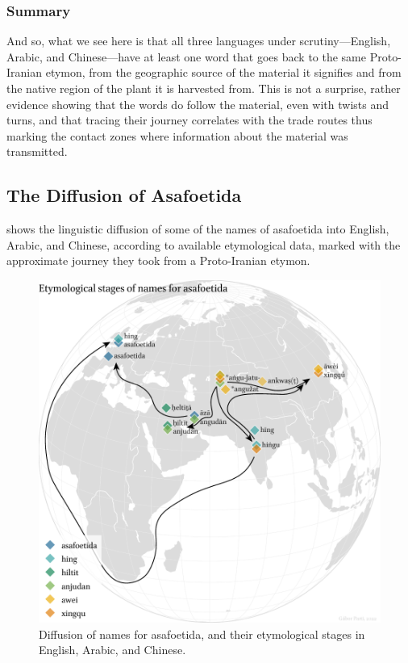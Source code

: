 


\subsubsection{Summary}

And so, what we see here is that all three languages under scrutiny---English, Arabic, and Chinese---have at least one word that goes back to the same Proto-Iranian etymon, from the geographic source of the material it signifies and from the native region of the plant it is harvested from. This is not a surprise, rather evidence showing that the words do follow the material, even with twists and turns, and that tracing their journey correlates with the trade routes thus marking the contact zones where information about the material was transmitted.



\subsection{The Diffusion of Asafoetida}

 shows the linguistic diffusion of some of the names of asafoetida into English, Arabic, and Chinese, according to available etymological data, marked with the approximate journey they took from a Proto-Iranian etymon.

\begin{figure}[ht]
    \centering
    \includegraphics[width=\textwidth]{imgs/plots/diffusion_asafoetida_edited.pdf}
    \caption[Diffusion of names for asafoetida, and their etymological stages.]{Diffusion of names for asafoetida, and their etymological stages in English, Arabic, and Chinese.}
    \label{fig:diffusion_asafoetida}
\end{figure}

